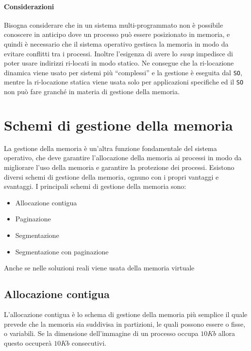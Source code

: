         \paragraph{Considerazioni}  
            Bisogna considerare che in un sistema multi-programmato non è possibile conoscere in anticipo dove un processo può essere posizionato in memoria, e quindi è necessario che il sistema operativo gestisca la memoria in modo da evitare conflitti tra i processi. 
            Inoltre l'esigenza di avere lo \textit{swap} impedisce di poter usare indirizzi ri-locati in modo statico. Ne consegue che la ri-locazione dinamica viene usato per sistemi più ``complessi'' e la gestione è eseguita dal \texttt{SO}, mentre la ri-locazione statica viene usata solo per applicazioni specifiche ed il \texttt{SO} non può fare granché in materia di gestione della memoria.
\section{Schemi di gestione della memoria}
    La gestione della memoria è un'altra funzione fondamentale del sistema operativo, che deve garantire l'allocazione della memoria ai processi in modo da migliorare l'uso della memoria e garantire la protezione dei processi.\newline
    Esistono diversi schemi di gestione della memoria, ognuno con i propri vantaggi e svantaggi. I principali schemi di gestione della memoria sono:
    \begin{itemize}
        \item Allocazione contigua
        \item Paginazione
        \item Segmentazione
        \item Segmentazione con paginazione
    \end{itemize}
    Anche se nelle soluzioni reali viene usata della memoria virtuale
    \subsection{Allocazione contigua}
        L'allocazione contigua è lo schema di gestione della memoria più semplice il quale prevede che la memoria sia suddivisa in partizioni, le quali possono essere o fisse, o variabili. Se la dimensione dell'immagine di un processo occupa $10Kb$ allora questo occuperà $10Kb$ consecutivi.
